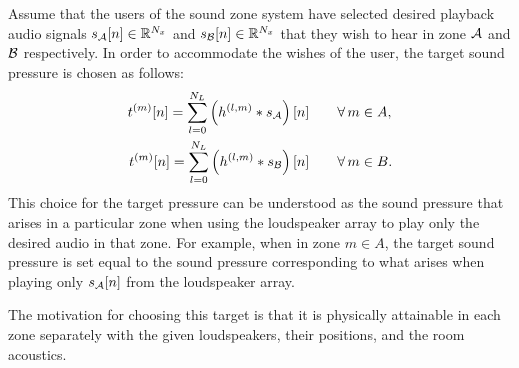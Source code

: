 Assume that the users of the sound zone system have selected desired playback audio signals $s_{\mathcal{A}}[n]\in\mathbb{R}^{N_x}$ and
$s_{\mathcal{B}}[n]\in\mathbb{R}^{N_x}$ that they wish to hear in zone $\mathcal{A}$ and $\mathcal{B}$ respectively.
In order to accommodate the wishes of the user, the target sound pressure is chosen as follows: 
\begin{align}
    \begin{aligned}
        t^{(m)}[n] = \sum_{l=0}^{N_L} \left(h^{(l,m)} \ast s_{\mathcal{A}}\right)[n]\qquad &\forall\,m\in A,\\
        t^{(m)}[n] = \sum_{l=0}^{N_L} \left(h^{(l,m)} \ast s_{\mathcal{B}}\right)[n]\qquad &\forall\,m\in B.
    \end{aligned}
    \label{eq:sound_zone:data_model:target_pressure}
\end{align}
This choice for the target pressure can be understood as the sound pressure that arises in a particular zone when using the loudspeaker array to play only the desired audio in that zone. 
For example, when in zone $m\in A$, the target sound pressure is set equal to the sound pressure corresponding to 
what arises when playing only $s_{\mathcal{A}}[n]$ from the loudspeaker array.

The motivation for choosing this target is that it is physically attainable in each zone separately
with the given loudspeakers, their positions, and the room acoustics.

